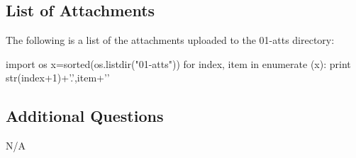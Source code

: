 \documentclass[main.tex]{subfiles}
\begin{document}
\subsection{List of Attachments}
\noindent The following is a list of the attachments uploaded to the 01-atts directory:
\hfill \break

\begin{python}
import os
x=sorted(os.listdir("01-atts"))  
for index, item in enumerate (x):
    print str(index+1)+'.',item+'\n'    
\end{python}

\subsection{Additional Questions}
N/A
\end{document}
